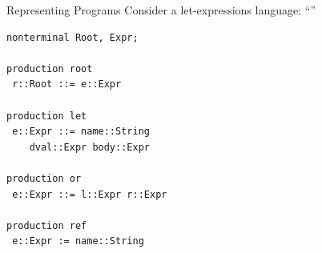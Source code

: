 \documentclass[11pt,aspectratio=169]{beamer}
\newcommand{\ys}{1.3}
\newcommand{\enve}[2]{\draw[blue] ($(#1-0.4,\ys*#2-0.35)$) circle(0.15);}
\newcommand{\envd}[2]{\filldraw[blue] ($(#1-0.4,\ys*#2-0.35)$) circle(0.05);}
\newcommand{\envc}[2]{\filldraw[blue] ($(#1-0.4,\ys*#2-0.35)$) circle(0.15);}
\newcommand{\ppe}[2]{\draw[dgreen] ($(#1+0.4,\ys*#2-0.35)$) circle(0.15);}
\newcommand{\ppd}[2]{\filldraw[dgreen] ($(#1+0.4,\ys*#2-0.35)$) circle(0.05);}
\newcommand{\ppc}[2]{\filldraw[dgreen] ($(#1+0.4,\ys*#2-0.35)$) circle(0.15);}
\newcommand{\vale}[2]{\draw[red] ($(#1+0.8,\ys*#2-0.35)$) circle(0.15);}
\newcommand{\vald}[2]{\filldraw[red] ($(#1+0.8,\ys*#2-0.35)$) circle(0.05);}
\newcommand{\valc}[2]{\filldraw[red] ($(#1+0.8,\ys*#2-0.35)$) circle(0.15);}
\newcommand{\erre}[2]{\draw[orange] ($(#1+1.2,\ys*#2-0.35)$) circle(0.15);}
\newcommand{\rtnna}[3]{
\draw ($(#1,#2*\ys)$) node{#3};

\draw[gray] ($(#1+0.65,\ys*#2+0.25)$) --
            ($(#1-0.3,\ys*#2+0.25)$) arc (90:270:4.5mm);

\draw[gray] ($(#1+0.65,\ys*#2+0.25)$) arc (90:-90:4.5mm) -- 
            ($(#1-0.3,\ys*#2-0.65)$) ;
}
\newcommand{\tnna}[3]{
\rtnna{#1}{#2}{#3}
}
\newcommand{\tnstr}[3]{
\draw ($(#1,#2*\ys)$) node{#3};
\draw[gray] ($(#1+0.25,\ys*#2+0.25)$) --
            ($(#1-0.2,\ys*#2+0.25)$) arc (90:270:2.5mm);

\draw[gray] ($(#1+0.25,\ys*#2+0.25)$) arc (90:-90:2.5mm) -- 
            ($(#1-0.2,\ys*#2-0.25)$) ;

}
\newcommand{\tedge}[4]{
\draw[gray] ($(#1+\xsh,\ys*#2-0.65)$) -- ($(#3+\xsh,\ys*#4+0.25)$);
}
\newcommand{\ppeval}{
\pause
\ppd{4}{4} %
\pause
\ppd{4}{3} %

\pause
\ppd{4}{2} %
\pause
\ppc{4}{2} %
\pause
\ppd{6.5}{2}  %

\pause
\ppd{5.25}{1} %
\pause
\ppc{5.25}{1} %
\pause
\ppd{7.75}{1} %
\pause
\ppc{7.75}{1} %

\pause
\ppc{6.5}{2}  %

\pause
\ppc{4}{3} %

\pause
\ppc{4}{4} %
}
\newcommand{\valeval}{
\pause\vald{4}{4} %
\pause\vald{4}{3} %

\pause\vald{6.5}{2}  %
\pause\vald{5.25}{1} %
\pause\valc{5.25}{1} %

\pause\vald{7.75}{1} %

\pause\envd{7.75}{1} %

\pause\envd{6.5}{2}  %

\pause
\draw ($(5.5,\ys*-0.5)$) node {\small\texttt{body.env = addEnv(name, dval.val, e.env);}};

\pause\vald{4}{2} %
\pause\valc{4}{2} %

\pause\envd{4}{3} %
\pause\envc{4}{3} %

\pause\envc{6.5}{2}  %

\pause
\draw[white] ($(5.5,\ys*-0.5)$) node {\small\texttt{body.env = addEnv(name, dval.val, e.env);}};

\pause\envc{7.75}{1} %

\pause\valc{7.75}{1} %
\pause\valc{6.5}{2}  %

\pause\valc{4}{3} %

\pause\valc{4}{4} %
}
\newcommand{\xsh}{0.15}
\begin{document}
\begin{frame}[t,fragile]{Representing Programs}
Consider a let-expressions language: 
``''

\bigskip

\begin{minipage}[t]{2.9in}
\vspace{0pt}
\end{minipage}
\begin{minipage}[t]{2.1in}
\vspace{0pt}
\small
\begin{verbatim}
nonterminal Root, Expr;

production root
 r::Root ::= e::Expr

production let
 e::Expr ::= name::String 
    dval::Expr body::Expr

production or
 e::Expr ::= l::Expr r::Expr

production ref
 e::Expr := name::String
\end{verbatim}
\end{minipage}

\end{frame}
\end{document}
